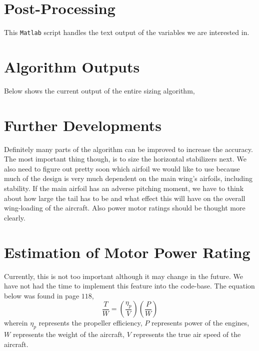 \documentclass[letter, 12pt]{article}
\begin{document}
\begin{center}
\section{Post-Processing}
\begin{comment}
\end{comment}
This \texttt{Matlab} script handles the text output of the variables we are interested in.



\section{Algorithm Outputs}
\begin{comment}
\end{comment}
Below shows the current output of the entire sizing algorithm,



\section{Further Developments}
\begin{comment}
\end{comment}
Definitely many parts of the algorithm can be improved to increase the accuracy. The most important thing though, is to size the horizontal stabilizers next. We also need to figure out pretty soon which airfoil we would like to use because much of the design is very much dependent on the main wing's airfoils, including stability. If the main airfoil has an adverse pitching moment, we have to think about how large the tail has to be and what effect this will have on the overall wing-loading of the aircraft. Also power motor ratings should be thought more clearly.

\section{Estimation of Motor Power Rating}
\begin{comment}
\end{comment}
Currently, this is not too important although it may change in the future. We have not had the time to implement this feature into the code-base.
The equation below was found in page $118$,
$$\frac{T}{W} = \left(\frac{\eta_{p}}{V}\right)\left(\frac{P}{W}\right)$$
wherein $\eta_{p}$ represents the propeller efficiency, 
$P$ represents power of the engines, $W$ represents the weight of the aircraft,
$V$ represents the true air speed of the aircraft.



\end{center}
\end{document}
